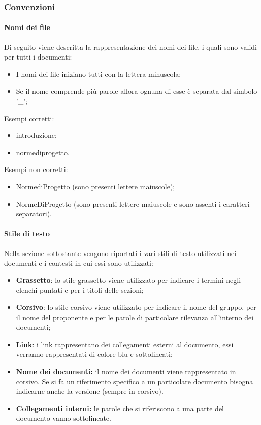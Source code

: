 \subsubsection{Convenzioni}
\paragraph{Nomi dei file}
Di seguito viene descritta la rappresentazione dei nomi dei file, i quali sono validi per tutti i documenti:
\begin{itemize}
    \item I nomi dei file iniziano tutti con la lettera minuscola;
    \item Se il nome comprende più parole allora ognuna di esse è separata dal simbolo '\_';
\end {itemize}
Esempi corretti:
\begin{itemize}
    \item introduzione;
    \item norme\textunderscore di\textunderscore progetto.
\end {itemize}
Esempi non corretti:
\begin{itemize}
    \item Norme\textunderscore di\textunderscore Progetto (sono presenti lettere maiuscole);
    \item NormeDiProgetto (sono presenti lettere maiuscole e sono assenti i caratteri separatori).
\end {itemize}

\paragraph{Stile di testo}
Nella sezione sottostante vengono riportati i vari stili di testo utilizzati nei documenti e i contesti in cui essi sono utilizzati:
\begin {itemize}
    \item \textbf{Grassetto}: lo stile grassetto viene utilizzato per indicare i termini negli elenchi puntati e per i titoli delle sezioni;
    \item \textbf{Corsivo}: lo stile corsivo viene utilizzato per indicare il nome del gruppo, per il nome del proponente e per le parole di particolare rilevanza all'interno dei documenti;
    \item \textbf{Link}: i link rappresentano dei collegamenti esterni al documento, essi verranno rappresentati di colore blu e sottolineati;
    \item \textbf{Nome dei documenti:} il nome dei documenti viene rappresentato in corsivo. Se si fa un riferimento specifico a un particolare documento bisogna indicarne anche la versione (sempre in corsivo).
    \item \textbf{Collegamenti interni:} le parole che si riferiscono a una parte del documento vanno sottolineate.
\end {itemize}

